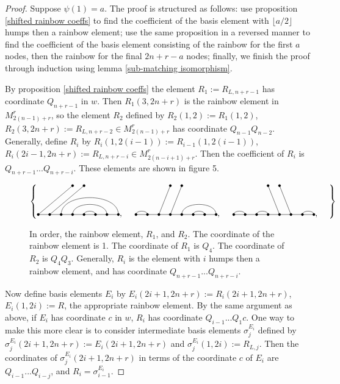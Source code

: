 \documentclass{amsart}
\begin{document}
 
 \begin{proof}
 	Suppose $\psi(1)=a$. The proof is structured as follows: use proposition \ref{shifted rainbow coeffs} to find the coefficient of the basis element with $\lfloor a/2\rfloor$ humps then a rainbow element; use the same proposition in a reversed manner to find the coefficient of the basis element consisting of the rainbow for the first $a$ nodes, then the rainbow for the final $2n+r-a$ nodes; finally, we finish the proof through induction using lemma \ref{sub-matching isomorphism}.
 	
 	\vspace{2mm}
 	By proposition \ref{shifted rainbow coeffs} the element $R_1:=R_{L,n+r-1}$ has coordinate $Q_{n+r-1}$ in $w$. Then $R_1(3,2n+r)$ is the rainbow element in  $M_{2(n-1)+r}^r$, so the element $R_2$ defined by $R_2(1,2):=R_1(1,2)$, $R_2(3,2n+r):=R_{L,n+r-2}\in M_{2(n-1)+r}^r$ has coordinate $Q_{n-1}Q_{n-2}$. Generally, define $R_i$ by $R_i(1,2(i-1)):=R_{i-1}(1,2(i-1))$, $R_i(2i-1,2n+r):=R_{L,n+r-i}\in M_{2(n-i+1)+r}^r$. Then the coefficient of $R_i$ is $Q_{n+r-1}...Q_{n+r-i}$. These elements are shown in figure 5.
 	
 	\begin{figure}
 		\def\cbasisspacing{5mm}
 		
 		$\cbr{
 			\begin{gathered}
 			\GeneralizedMatching{8}{3/8, 4/7,5/6}{2}{1/1,2/2}{5/4}, \hspace{\cbasisspacing}
 			\GeneralizedMatching{8}{1/2, 5/8,6/7}{2}{3/1,4/2}{5/4}, 
 			\hspace{\cbasisspacing}
 			\GeneralizedMatching{8}{1/2, 3/4,7/8}{2}{5/1,6/2}{5/4}, \hspace{\cbasisspacing}
 			\end{gathered}}$ 
 		\caption{In order, the rainbow element, $R_1$, and $R_2$. The coordinate of the rainbow element is 1. The coordinate of $R_1$ is $Q_{4}$. The coordinate of $R_2$ is $Q_4Q_3$. Generally, $R_i$ is the element with $i$ humps then a rainbow element, and has coordinate $Q_{n+r-1}...Q_{n+r-i}$.}
 	\end{figure}
 	
 	Now define basis elements $E_i$ by $E_i(2i+1,2n+r):=R_i(2i+1,2n+r)$, $E_i(1,2i):=R$, the appropriate rainbow element. By the same argument as above, if $E_i$ has coordinate $c$ in $w$, $R_i$ has coordinate $Q_{i-1}...Q_{1}c$. One way to make this more clear is to consider intermediate basis elements $\sigma_j^{E_i}$ defined by $\sigma_j^{E_i}(2i+1,2n+r):=E_i(2i+1,2n+r)$ and $\sigma_j^{E_i}(1,2i):=R_{L,j}$. Then the coordinates of $\sigma_j^{E_i}(2i+1,2n+r)$ in terms of the coordinate $c$ of $E_i$ are $Q_{i-1}...Q_{i-j}$, and $R_i=\sigma_{i-1}^{E_i}$. 
 	

\end{proof}
\end{document}

